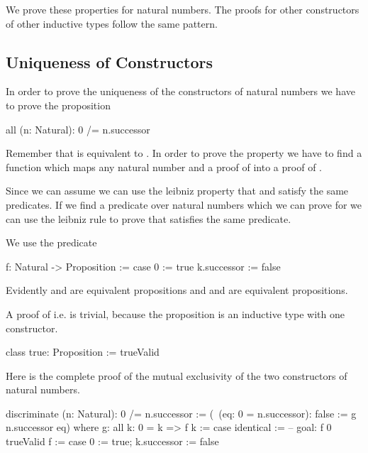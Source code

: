 We prove these properties for natural numbers. The proofs for other constructors
of other inductive types follow the same pattern.




\subsection{Uniqueness of Constructors}

In order to prove the uniqueness of the constructors of natural numbers we have
to prove the proposition

\begin{alba}
    all (n: Natural): 0 /= n.successor
\end{alba}

Remember that  is equivalent to . In order to prove the property we have to find a function which
maps any natural number  and a proof of  into a
proof of .

Since we can assume  we can use the leibniz property that
 and  satisfy the same predicates. If we find a
predicate over natural numbers which we can prove for  we can use the
leibniz rule to prove that  satisfies the same predicate.

We use the predicate
\begin{alba}
    f: Natural -> Proposition :=
        case
            0 :=
                true
            k.successor :=
                false
\end{alba}

Evidently  and  are equivalent propositions and  and  are equivalent propositions.

A proof of  i.e.  is trivial, because the proposition
 is an inductive type with one constructor.

\begin{alba}
    class true: Proposition := trueValid
\end{alba}


Here is the complete proof of the mutual exclusivity of the two constructors of
natural numbers.


\begin{alba}
    discriminate (n: Natural): 0 /= n.successor
    :=
        (\ (eq: 0 = n.successor): false := g n.successor eq)
        where
            g: all k: 0 = k => f k :=
                case
                    identical :=
                        -- goal: f 0
                        trueValid
            f :=
                case 0 := true; k.successor := false
\end{alba}


